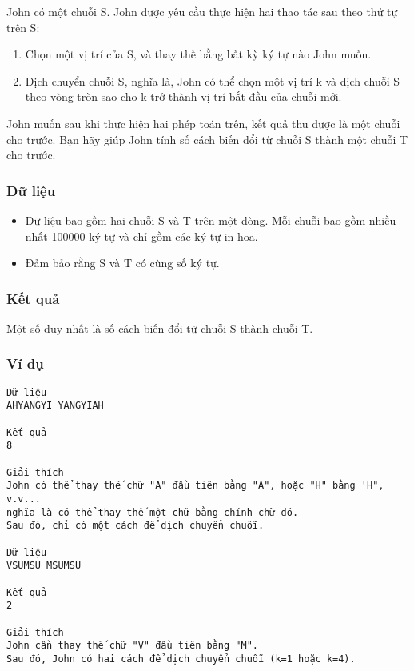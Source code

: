 



   John có một chuỗi S. John được yêu cầu thực hiện hai thao tác sau       theo thứ tự      trên S:  
\begin{enumerate}
	\item     Chọn một vị trí của S, và thay thế bằng bất kỳ ký tự nào John muốn.   
	\item     Dịch chuyển chuỗi S, nghĩa là, John có thể chọn một vị trí k và dịch chuỗi S theo vòng tròn sao cho k trở thành vị trí bắt đầu của chuỗi mới.   
\end{enumerate}

   John muốn sau khi thực hiện hai phép toán trên, kết quả thu được là một chuỗi cho trước.  Bạn hãy giúp John tính số cách biến đổi từ chuỗi S thành một chuỗi T cho trước.  

\subsubsection{   Dữ liệu  }
\begin{itemize}
	\item     Dữ liệu bao gồm hai chuỗi S và T trên một dòng. Mỗi chuỗi bao gồm nhiều nhất 100000 ký tự và chỉ gồm các ký tự in hoa.   
	\item     Đảm bảo rằng S và T có cùng số ký tự.   
\end{itemize}

\subsubsection{   Kết quả  }

   Một số duy nhất là số cách biến đổi từ chuỗi S thành chuỗi T.  

\subsubsection{   Ví dụ  }
\begin{verbatim}
Dữ liệu
AHYANGYI YANGYIAH

Kết quả
8

Giải thích
John có thể thay thế chữ "A" đầu tiên bằng "A", hoặc "H" bằng 'H", v.v...
nghĩa là có thể thay thế một chữ bằng chính chữ đó.
Sau đó, chỉ có một cách để dịch chuyển chuỗi.

Dữ liệu
VSUMSU MSUMSU

Kết quả
2

Giải thích
John cần thay thế chữ "V" đầu tiên bằng "M".
Sau đó, John có hai cách để dịch chuyển chuỗi (k=1 hoặc k=4).
\end{verbatim}